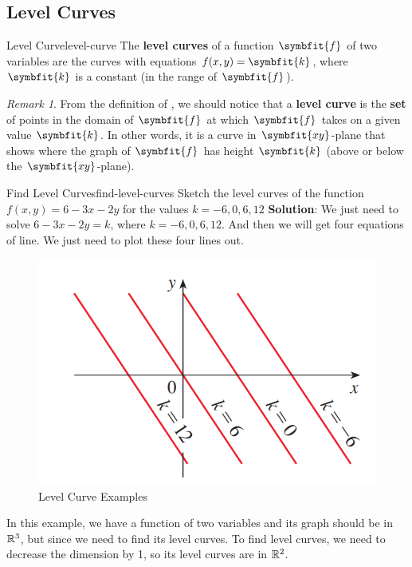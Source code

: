 \documentclass[math,code]{amznotes}
\theoremstyle{remark}
\newtheorem*{remark}{Remark}
\begin{document}
\subsection{Level Curves}
\begin{dfnbox}{Level Curve}{level-curve}
    The {\color{red} \textbf{level curves}} of a function $\symbfit{f}$ of two variables are the curves with equations $f(x,y)=\symbfit{k}$, where $\symbfit{k}$ is a constant (in the range of $\symbfit{f}$).
\end{dfnbox}
\begin{notebox}
    \begin{remark}
        From the definition of , we should notice that a {\color{red} \textbf{level curve}} is the {\color{red} \textbf{set}} of points in the domain of $\symbfit{f}$ at which $\symbfit{f}$ takes on a given value $\symbfit{k}$. In other words, it is a curve in {\color{red} $\symbfit{xy}$-plane} that shows where the graph of $\symbfit{f}$ has height $\symbfit{k}$ (above or below the $\symbfit{xy}$-plane).
    \end{remark}
\end{notebox}
\begin{exbox}{Find Level Curves}{find-level-curves}
    Sketch the level curves of the function $f(x,y)=6-3x-2y$ for the values $k=-6,0,6,12$ \newline
    {\color{blue} \textbf{Solution}}: We just need to solve $6-3x-2y=k$, where $k=-6,0,6,12$. And then we will get four equations of line. We just need to plot these four lines out.
    \begin{figure}[H]
        \centering
        \includegraphics[width=0.5\linewidth]{images/level-curve-example.png}
        \caption{Level Curve Examples}
        \label{fig:level-curve-examples}
    \end{figure}
    In this example, we have a function of two variables and its graph should be in $\mathbb{R}^3$, but since we need to find its level curves. To find level curves, we need to decrease the dimension by 1, so its level curves are in $\mathbb{R}^2$.
\end{exbox}
\end{document}
